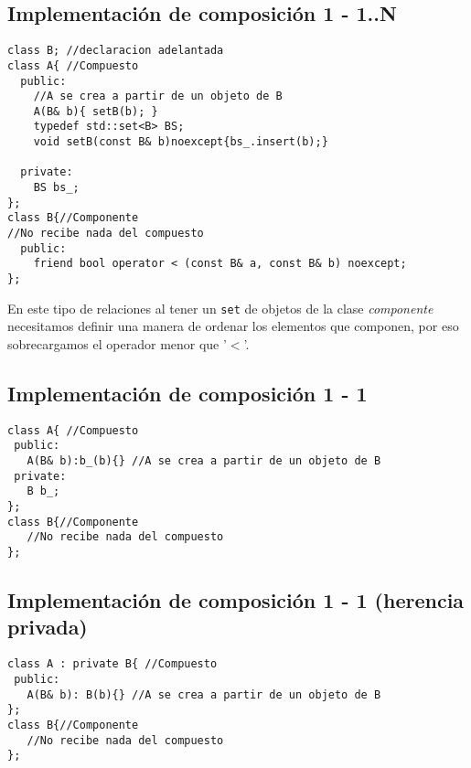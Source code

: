 \subsection{ Implementación de composición 1 - 1..N}
\begin{center}
	\begin{lstlisting}[frame=single]
class B; //declaracion adelantada
class A{ //Compuesto
  public:
    //A se crea a partir de un objeto de B
    A(B& b){ setB(b); }
    typedef std::set<B> BS;
    void setB(const B& b)noexcept{bs_.insert(b);}
      
  private:
    BS bs_;
};
class B{//Componente
//No recibe nada del compuesto
  public:
    friend bool operator < (const B& a, const B& b) noexcept;
};
\end{lstlisting}
\end{center}
En este tipo de relaciones al tener un \texttt{set} de objetos de la clase \textit{componente} necesitamos definir una manera de ordenar los elementos que componen, por eso sobrecargamos el operador menor que '$<$'.

\subsection{Implementación de composición 1 - 1}
\begin{center}
	\begin{lstlisting}[frame=single]
class A{ //Compuesto
 public:
   A(B& b):b_(b){} //A se crea a partir de un objeto de B
 private:
   B b_;
};
class B{//Componente
   //No recibe nada del compuesto
};
\end{lstlisting}
\end{center}

\subsection{Implementación de composición 1 - 1 (herencia privada)}
\begin{center}
	\begin{lstlisting}[frame=single]
class A : private B{ //Compuesto
 public:
   A(B& b): B(b){} //A se crea a partir de un objeto de B
};
class B{//Componente
   //No recibe nada del compuesto
};
\end{lstlisting}
\end{center}